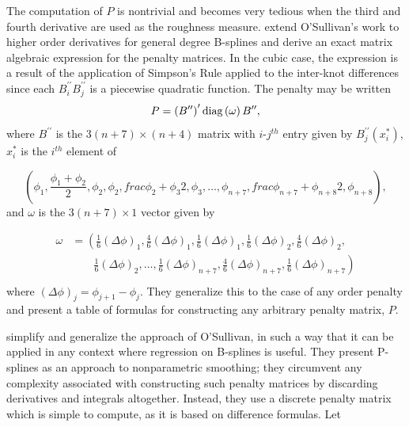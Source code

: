 \documentclass[12pt]{article}
\newcommand*\needsparaphrased{\color{red}}
\begin{document}
The computation of $P$ is nontrivial and becomes very tedious when the third and fourth derivative are used as the roughness measure. \cite{wand2008semiparametric} extend O'Sullivan's work to higher order derivatives for general degree B-splines and derive an exact matrix algebraic expression for the penalty matrices. In the cubic case, the expression is a result of the application of Simpson's Rule applied to the inter-knot differences since each $B_i^{\prime \prime} B_j^{\prime \prime}$ is a piecewise quadratic function. The penalty may be written
 \[
 P = \left(B^{\prime \prime}\right)^\prime \textup{diag}\left(\omega \right) B^{\prime \prime}, 
 \]
 \noindent
 where $B^{\prime \prime}$ is the $3\left( n + 7 \right) \times \left( n + 4 \right)$ matrix with $i$-$j^{th}$ entry given by $B_j^{\prime \prime} \left(x_i^*\right)$, $x^*_i$ is the $i^{th}$ element of 
 
\[
\left( \phi_1,\frac{\phi_1+\phi_2}{2},\phi_2,\phi_2,frac{\phi_2+\phi_3}{2},\phi_3,\dots,\phi_{n+7},frac{\phi_{n+7}+\phi_{n+8}}{2},\phi_{n+8} \right),
\]
 \noindent
 and $\omega$ is the $3\left(n+7\right) \times 1$ vector given by
 
\begin{align*}
\omega &= \left( \frac{1}{6}\left(\Delta \phi \right)_1,\frac{4}{6}\left(\Delta \phi \right)_1, \frac{1}{6}\left(\Delta \phi \right)_1,\frac{1}{6}\left(\Delta \phi \right)_2, \frac{4}{6}\left(\Delta \phi \right)_2,  \right. \\
&\qquad   \left. {} \frac{1}{6}\left(\Delta \phi \right)_2 , \dots , \frac{1}{6}\left(\Delta \phi \right)_{n+7}, \frac{4}{6}\left(\Delta \phi \right)_{n+7}, \frac{1}{6}\left(\Delta \phi \right)_{n+7}  \right) \\
\end{align*}
\noindent
 where $\left(\Delta \phi \right)_j = \phi_{j+1}-\phi_j$. They generalize this to the case of any order penalty and present a table of formulas for constructing any arbitrary penalty matrix, $P$.
 
 {\needsparaphrased  \cite{eilers1996flexible} simplify and generalize the approach of O'Sullivan, in such a way that it can be applied in any context where regression on B-splines is useful. }They present P-splines as an approach to nonparametric smoothing; they circumvent any complexity associated with constructing such penalty matrices by discarding derivatives and integrals altogether. Instead, they use a discrete penalty matrix which is simple to compute, as it is based on difference formulas. Let 
 
\end{document}
